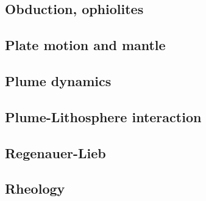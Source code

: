 \cite{leki09}
\cite{roms10}
\cite{ledg14}

\subsection*{Obduction, ophiolites}

\cite{hack90}
\cite{hack91}
\cite{agzf14}

\subsection*{Plate motion and mantle}

\cite{zieg92a}
\cite{zhgm98}
\cite{lizh09}
\cite{huss12}
\cite{yoha15}

\subsection*{Plume dynamics}

\cite{nasf94}\cite{hayu94}
\cite{lays99}
\cite{isst06}
\cite{dagm13}
\cite{daso15}
\cite{dacc18}

\subsection*{Plume-Lithosphere interaction}

\cite{rich94}

\subsection*{Regenauer-Lieb}

\cite{reyu00}
\cite{reyu03}
\cite{reyu04}
\cite{rehy06}\cite{rewr06}
\cite{rerw08}
\cite{reps09}
\cite{revp13}

\subsection*{Rheology}

\cite{druc51}
\cite{hafn51}
\cite{drpr52}
\cite{hand69}
\cite{delo81}
\cite{rafi84}
\cite{rydr00}\cite{rana00}
\cite{lova01}
\cite{hirt02}
\cite{hiko03}
\cite{didr05}\cite{drur05}
\cite{rygw06}
\cite{hirw07}
\cite{lemm08}
\cite{lell11}
\cite{reyn12}
\cite{lepo13}


